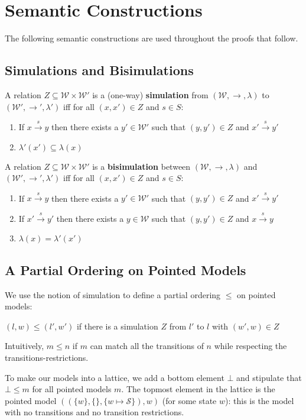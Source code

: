 \documentclass[smallextended]{svjour3}       %
\numberwithin{subcase}{mycase}
\begin{document}
\section{Semantic Constructions}
The following semantic constructions are used throughout the proofs that follow.
\subsection{Simulations and Bisimulations}

A relation $Z \subseteq \mathcal{W} \times \mathcal{W}'$ is a (one-way) {\bf simulation} from  $(\mathcal{W}, \rightarrow, \lambda)$ to $(\mathcal{W}', \rightarrow', \lambda')$ iff for all $(x,x') \in Z$ and $s \in S$:
\begin{enumerate}
\item
If $x \xrightarrow{s} y$ then there exists a $y' \in \mathcal{W}'$ such that $(y,y') \in Z$ and $x' \xrightarrow{s} y'$
\item
$\lambda'(x') \subseteq \lambda(x)$
\end{enumerate}
A relation $Z \subseteq \mathcal{W} \times \mathcal{W}'$ is a {\bf bisimulation} between  $(\mathcal{W}, \rightarrow, \lambda)$ and $(\mathcal{W}', \rightarrow', \lambda')$ iff for all $(x,x') \in Z$ and $s \in S$:
\begin{enumerate}
\item
If $x \xrightarrow{s} y$ then there exists a $y' \in \mathcal{W}'$ such that $(y,y') \in Z$ and $x' \xrightarrow{s} y'$
\item
If $x' \xrightarrow{s} y'$ then there exists a $y \in \mathcal{W}$ such that $(y,y') \in Z$ and $x \xrightarrow{s} y$
\item
$\lambda(x) = \lambda'(x')$
\end{enumerate}

\subsection{A Partial Ordering on Pointed Models}
We use the notion of simulation to define a partial ordering $\leq$ on pointed models:
\begin{definition}
$(l,w) \leq (l',w')$ if there is a simulation $Z$ from $l'$ to $l$ with $(w',w) \in Z$
\end{definition}
Intuitively, $m \leq n$ if $m$ can match all the transitions of $n$ while respecting the transitions-restrictions.

To make our models into a lattice, we add a bottom element $\bot$ and stipulate that $\bot \leq m$ for all pointed models $m$.
The topmost element in the lattice is the pointed model $( (\{w\}, \{\}, \{w \mapsto \mathcal{S}\}), w)$ (for some state $w$): this is the model with no transitions and no transition restrictions.
\end{document}
